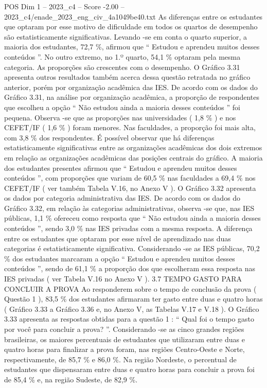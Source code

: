 \begin{textsample}{POS Dim 1 – 2023\_c4 – Score -2.00 – 2023\_c4/enade\_2023\_eng\_civ\_4a1049be40.txt}
As diferenças entre os estudantes que optaram por esse motivo de dificuldade em todos os quartos de desempenho são estatisticamente significativas.
Levando -se em conta o quarto superior, a maioria dos estudantes, 72,7 \%, afirmou que “ Estudou e aprendeu muitos desses conteúdos ”.
No outro extremo, no 1.º quarto, 54,1 \% optaram pela mesma categoria.
As proporções são crescentes com o desempenho.
O Gráfico 3.31 apresenta outros resultados também acerca dessa questão retratada no gráfico anterior, porém por organização acadêmica das IES.
De acordo com os dados do Gráfico 3.31, na análise por organização acadêmica, a proporção de respondentes que escolheu a opção “ Não estudou ainda a maioria desses conteúdos ” foi pequena.
Observa -se que as proporções nas universidades ( 1,8 \% ) e nos CEFET/IF ( 1,6 \% ) foram menores.
Nas faculdades, a proporção foi mais alta, com 3,8 \% dos respondentes.
É possível observar que há diferenças estatisticamente significativas entre as organizações acadêmicas dos dois extremos em relação as organizações acadêmicas das posições centrais do gráfico.
A maioria dos estudantes presentes afirmou que “ Estudou e aprendeu muitos desses conteúdos ”, com proporções que variam de 60,5 \% nas faculdades a 69,4 \% nos CEFET/IF ( ver também Tabela V.16, no Anexo V ).
O Gráfico 3.32 apresenta os dados por categoria administrativa das IES.
De acordo com os dados do Gráfico 3.32, em relação às categorias administrativas, observa -se que, nas IES públicas, 1,1 \% ofereceu como resposta que “ Não estudou ainda a maioria desses conteúdos ”, sendo 3,0 \% nas IES privadas com a mesma resposta.
A diferença entre os estudantes que optaram por esse nível de aprendizado nas duas categorias é estatisticamente significativa.
Considerando -se as IES públicas, 70,2 \% dos estudantes marcaram a opção “ Estudou e aprendeu muitos desses conteúdos ”, sendo de 61,1 \% a proporção dos que escolheram essa resposta nas IES privadas ( ver Tabela V.16 no Anexo V ). 3.7 TEMPO GASTO PARA CONCLUIR A PROVA Ao responderem sobre o tempo de conclusão da prova ( Questão 1 ), 83,5 \% dos estudantes afirmaram ter gasto entre duas e quatro horas ( Gráfico 3.33 a Gráfico 3.36 e, no Anexo V, as Tabelas V.17 e V.18 ).
O Gráfico 3.33 apresenta as respostas obtidas para a questão 1 : “ Qual foi o tempo gasto por você para concluir a prova? ”.
Considerando -se as cinco grandes regiões brasileiras, os maiores percentuais de estudantes que utilizaram entre duas e quatro horas para finalizar a prova foram, nas regiões Centro-Oeste e Norte, respectivamente, de 85,7 \% e 86,0 \%.
Na região Nordeste, o percentual de estudantes que dispensaram entre duas e quatro horas para concluir a prova foi de 85,4 \% e, na região Sudeste, de 82,9 \%.

\end{textsample}
